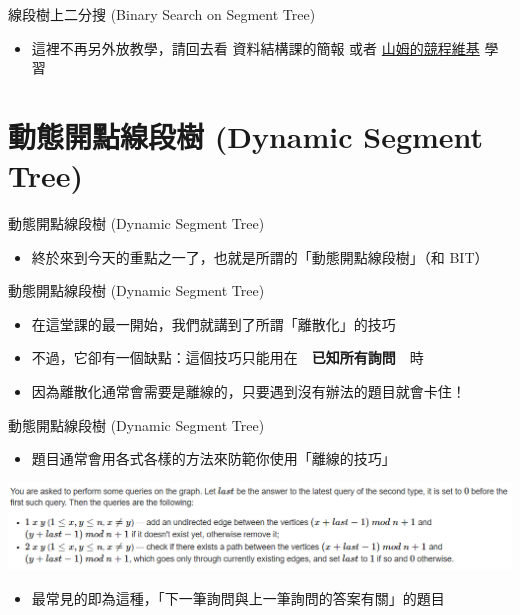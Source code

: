 \documentclass[aspectratio=169]{beamer}
\begin{document}
    \begin{frame}[fragile]{線段樹上二分搜 (Binary Search on Segment Tree)}
        \begin{itemize}
            \item 這裡不再另外放教學，請回去看 資料結構課的簡報 或者 \href{https://wiki.sam571128.codes/data-structure/segment-tree/segment-tree-2}{山姆的競程維基} 學習
        \end{itemize}
    \end{frame}

    \section{動態開點線段樹 (Dynamic Segment Tree)}

    \begin{frame}{動態開點線段樹 (Dynamic Segment Tree)}
        \begin{itemize}
            \item 終於來到今天的重點之一了，也就是所謂的「動態開點線段樹」（和 BIT）
        \end{itemize}
    \end{frame}

    \begin{frame}{動態開點線段樹 (Dynamic Segment Tree)}
        \begin{itemize}
            \item 在這堂課的最一開始，我們就講到了所謂「離散化」的技巧
            \item 不過，它卻有一個缺點：這個技巧只能用在　\textbf{已知所有詢問}　時
            \item<2-> 因為離散化通常會需要是離線的，只要遇到沒有辦法的題目就會卡住！
        \end{itemize}
    \end{frame}

    \begin{frame}{動態開點線段樹 (Dynamic Segment Tree)}
        \begin{itemize}
            \item 題目通常會用各式各樣的方法來防範你使用「離線的技巧」
        \end{itemize}
        \begin{center}
            \includegraphics[scale=0.5]{dynamic/Forced_Online_Queries.png}
        \end{center}
        \begin{itemize}
            \item 最常見的即為這種，「下一筆詢問與上一筆詢問的答案有關」的題目
        \end{itemize}
    \end{frame}
\end{document}
